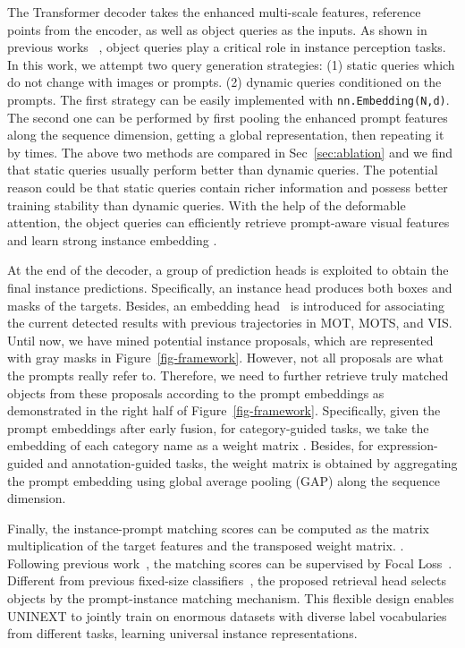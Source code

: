 \documentclass[10pt,twocolumn,letterpaper]{article}
\begin{document}
The Transformer decoder takes the enhanced multi-scale features,  reference points from the encoder, as well as  object queries as the inputs. As shown in previous works ~\cite{ReferFormer,Trackformer,VISTR,DINO}, object queries play a critical role in instance perception tasks. In this work, we attempt two query generation strategies: (1) static queries which do not change with images or prompts. (2) dynamic queries conditioned on the prompts. The first strategy can be easily implemented with \texttt{nn.Embedding(N,d)}. The second one can be performed by first pooling the enhanced prompt features  along the sequence dimension, getting a global representation, then repeating it by  times. The above two methods are compared in Sec~\ref{sec:ablation} and we find that static queries usually perform better than dynamic queries. The potential reason could be that static queries contain richer information and possess better training stability than dynamic queries. With the help of the deformable attention, the object queries can efficiently retrieve prompt-aware visual features and learn strong instance embedding .

At the end of the decoder, a group of prediction heads is exploited to obtain the final instance predictions. Specifically, an instance head produces both boxes and masks of the targets. Besides, an embedding head~\cite{IDOL} is introduced for associating the current detected results with previous trajectories in MOT, MOTS, and VIS. Until now, we have mined  potential instance proposals, which are represented with gray masks in Figure~\ref{fig-framework}. However, not all proposals are what the prompts really refer to. Therefore, we need to further retrieve truly matched objects from these proposals according to the prompt embeddings as demonstrated in the right half of Figure~\ref{fig-framework}. Specifically, given the prompt embeddings  after early fusion, for category-guided tasks, we take the embedding of each category name as a weight matrix . Besides, for expression-guided and annotation-guided tasks, the weight matrix  is obtained by aggregating the prompt embedding  using global average pooling (GAP) along the sequence dimension. 



Finally, the instance-prompt matching scores  can be computed as the matrix multiplication of the target features and the transposed weight matrix. . Following previous work~\cite{GLIP}, the matching scores can be supervised by Focal Loss~\cite{RetinaNet}. Different from previous fixed-size classifiers~\cite{DeformableDETR}, the proposed retrieval head selects objects by the prompt-instance matching mechanism. This flexible design enables UNINEXT to jointly train on enormous datasets with diverse label vocabularies from different tasks, learning universal instance representations.
\end{document}
